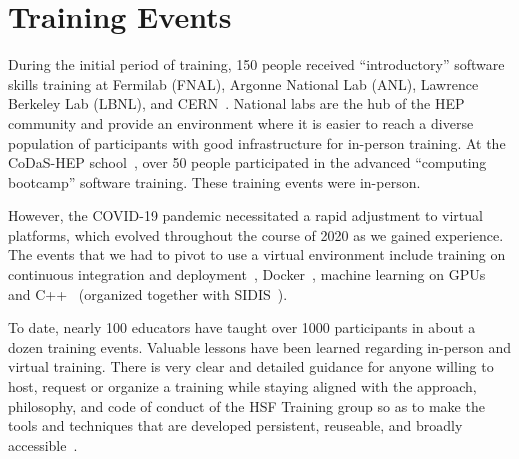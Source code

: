 \documentclass[twocolumn]{svjour3}          %
\begin{document}
\section{Training Events}\label{sec:Training}

During the initial period of training, 150 people received \enquote{introductory} software skills training at Fermilab (FNAL), Argonne National Lab (ANL), Lawrence Berkeley Lab (LBNL), and CERN~\cite{HSF-training-SC-FNAL-2019,HSF-training-ATLAS-ANL-2019,HSF-training-ATLAS-LBNL-2019,HSF-training-SC-CERN-2019}. National labs are the hub of the HEP community and provide an environment where it is easier to reach a diverse population of participants with good infrastructure for in-person training. At the CoDaS-HEP school~\cite{codas-hep}, over 50 people participated in the advanced \enquote{computing bootcamp} software training. These training events were in-person.

However, the COVID-19 pandemic necessitated a rapid adjustment to virtual platforms, which evolved throughout the course of 2020 as we gained experience. The events that we had to pivot to use a virtual environment include training on continuous integration and deployment~\cite{cicd_gitlab,cicd_github}, Docker~\cite{docker}, machine learning on GPUs \cite{mlgpu} and C++~\cite{cplusplus1} (organized together with SIDIS~\cite{sidis}).

To date, nearly 100 educators have taught over 1000 participants in about a dozen training events. Valuable lessons have been learned regarding in-person and virtual training. There is very clear and detailed guidance for anyone willing to host, request or organize a training while staying aligned with the approach, philosophy, and code of conduct of the HSF Training group so as to make the tools and techniques that are developed persistent, reuseable, and broadly accessible~\cite{HSF-training-how-to}.
\end{document}
